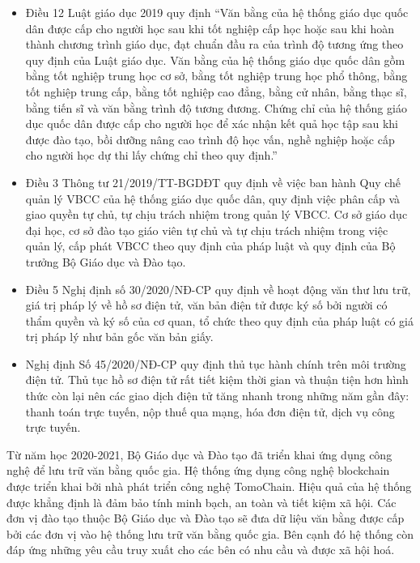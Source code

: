 \begin{itemize}
\item Điều 12 Luật giáo dục 2019 quy định “Văn bằng của hệ thống giáo dục quốc dân được cấp cho người học sau khi tốt nghiệp cấp học hoặc sau khi hoàn thành chương trình giáo dục, đạt chuẩn đầu ra của trình độ tương ứng theo quy định của Luật giáo dục. Văn bằng của hệ thống giáo dục quốc dân gồm bằng tốt nghiệp trung học cơ sở, bằng tốt nghiệp trung học phổ thông, bằng tốt nghiệp trung cấp, bằng tốt nghiệp cao đẳng, bằng cử nhân, bằng thạc sĩ, bằng tiến sĩ và văn bằng trình độ tương đương. Chứng chỉ của hệ thống giáo dục quốc dân được cấp cho người học để xác nhận kết quả học tập sau khi được đào tạo, bồi dưỡng nâng cao trình độ học vấn, nghề nghiệp hoặc cấp cho người học dự thi lấy chứng chỉ theo quy định.”

\item Điều 3 Thông tư 21/2019/TT-BGDĐT quy định về việc ban hành Quy chế quản lý VBCC của hệ thống giáo dục quốc dân, quy định việc phân cấp và giao quyền tự chủ, tự chịu trách nhiệm trong quản lý VBCC. Cơ sở giáo dục đại học, cơ sở đào tạo giáo viên tự chủ và tự chịu trách nhiệm trong việc quản lý, cấp phát VBCC theo quy định của pháp luật và quy định của Bộ trưởng Bộ Giáo dục và Đào tạo.

\item Điều 5 Nghị định số 30/2020/NĐ-CP quy định về hoạt động văn thư lưu trữ, giá trị pháp lý về hồ sơ điện tử, văn bản điện tử được ký số bởi người có thẩm quyền và ký số của cơ quan, tổ chức theo quy định của pháp luật có giá trị pháp lý như bản gốc văn bản giấy.

\item Nghị định Số 45/2020/NĐ-CP quy định thủ tục hành chính trên môi trường điện tử. 
Thủ tục hồ sơ điện tử rất tiết kiệm thời gian và thuận tiện hơn hình thức còn lại nên các giao dịch điện tử tăng nhanh trong những năm gần đây: thanh toán trực tuyến, nộp thuế qua mạng, hóa đơn điện tử, dịch vụ công trực tuyến.
\end{itemize}

Từ năm học 2020-2021, Bộ Giáo dục và Đào tạo đã triển khai ứng dụng công nghệ để lưu trữ văn bằng quốc gia. 
Hệ thống ứng dụng công nghệ blockchain được triển khai bởi nhà phát triển công nghệ TomoChain. 
Hiệu quả của hệ thống được khẳng định là đảm bảo tính minh bạch, an toàn và tiết kiệm xã hội. 
Các đơn vị đào tạo thuộc Bộ Giáo dục và Đào tạo sẽ đưa dữ liệu văn bằng được cấp bởi các đơn vị vào hệ thống lưu trữ văn bằng quốc gia. Bên cạnh đó hệ thống còn đáp ứng những yêu cầu truy xuất cho các bên có nhu cầu và được xã hội hoá.

